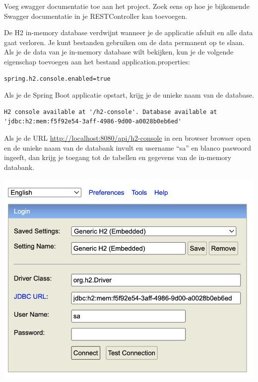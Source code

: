 \begin{oefening}
Voeg swagger documentatie toe aan het project. Zoek eens op hoe je bijkomende Swagger documentatie in je RESTController kan toevoegen.
\end{oefening}


\begin{tcolorbox}[colback=blue!5!white,colframe=blue!75!black,title=H2 database]
De H2 in-memory database verdwijnt wanneer je de applicatie afsluit en alle data gaat verloren.
Je kunt bestanden gebruiken om de data permanent op te slaan. Als je de data van je in-memory database wilt bekijken, kun je de volgende eigenschap toevoegen aan het bestand application.properties:
\begin{lstlisting}[frame=single]
spring.h2.console.enabled=true
\end{lstlisting}
Als je de Spring Boot applicatie opstart, krijg je de unieke naam van de database. 
\begin{lstlisting}[frame=single]
H2 console available at '/h2-console'. Database available at 'jdbc:h2:mem:f5f92e54-3aff-4986-9d00-a0028b0eb6ed'
\end{lstlisting}
Als je de URL \url{http://localhost:8080/api/h2-console} in een browser browser open en de unieke naam van de databank invult en username ``sa'' en blanco paswoord ingeeft, dan krijg je toegang tot de tabellen en gegevens van de in-memory databank. 

\includegraphics[width=\textwidth]{./images/chapter2/h2-database.png} 

\end{tcolorbox}

